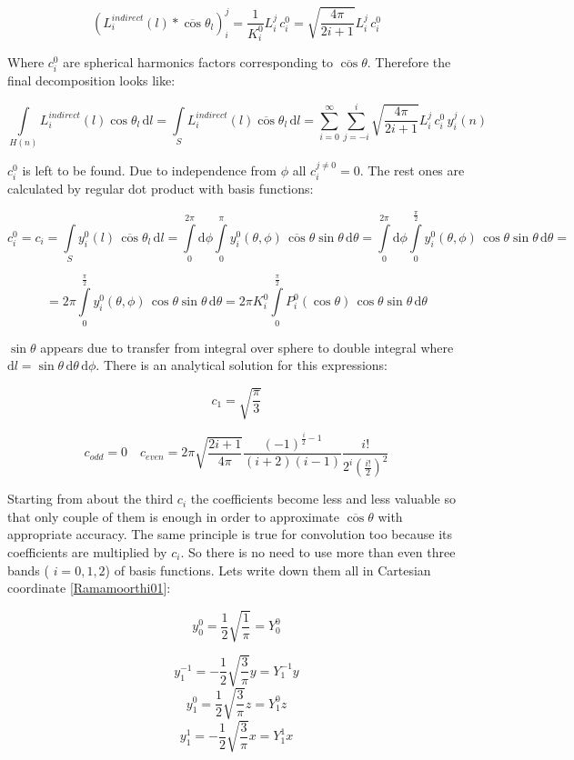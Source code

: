 \[(L_i^{indirect}(l) \ast \overline{\cos}\theta_l)_i^j = \frac{1}{K_i^0}L_i^j\, c_i^0 = \sqrt{\frac{4\pi}{2i+1}}L_i^j\, c_i^0\]

Where $c_i^0$ are spherical harmonics factors corresponding to $\overline{\cos}\theta$. Therefore the final decomposition looks like\+:

\[\int\limits_{H(n)} L_i^{indirect}(l) \cos\theta_l\, \mathrm{d}l = \int\limits_S L_i^{indirect}(l)\overline{\cos}\theta_l\, \mathrm{d}l = \sum_{i=0}^\infty \sum_{j = -i}^i \sqrt{\frac{4\pi}{2i+1}}L_i^j\, c_i^0\, y_i^j(n)\]

$c_i^0$ is left to be found. Due to independence from $\phi$ all $c_i^{j \neq 0} = 0$. The rest ones are calculated by regular dot product with basis functions\+:

\[c_i^0 = c_i = \int\limits_S y_i^0(l)\, \overline{\cos}\theta_l\, \mathrm{d}l = \int\limits_0^{2\pi} \mathrm{d}\phi \int\limits_0^\pi y_i^0(\theta, \phi)\, \overline{\cos}\theta \sin\theta\, \mathrm{d}\theta = \int\limits_0^{2\pi} \mathrm{d}\phi \int\limits_0^\frac{\pi}{2} y_i^0(\theta, \phi)\, \cos\theta\sin\theta\, \mathrm{d}\theta = \]

\[= 2\pi\int\limits_0^\frac{\pi}{2} y_i^0(\theta, \phi)\, \cos\theta\sin\theta\, \mathrm{d}\theta = 2\pi K_i^0\int\limits_0^\frac{\pi}{2} P_i^0(\cos\theta)\, \cos\theta\sin\theta\, \mathrm{d}\theta\]

$\sin\theta$ appears due to transfer from integral over sphere to double integral where $\mathrm{d}l = \sin\theta\, \mathrm{d}\theta\, \mathrm{d}\phi$. There is an analytical solution for this expressions\+:

\[c_1 = \sqrt{\frac{\pi}{3}}\]

\[c_{odd} = 0 \quad c_{even} = 2\pi\sqrt{\frac{2i+1}{4\pi}}\frac{(-1)^{\frac{i}{2}-1}}{(i+2)(i-1)}\frac{i!}{2^i\left(\frac{i!}{2}\right)^2}\]

Starting from about the third $c_i$ the coefficients become less and less valuable so that only couple of them is enough in order to approximate $\overline{\cos}\theta$ with appropriate accuracy. The same principle is true for convolution too because its coefficients are multiplied by $c_i$. So there is no need to use more than even three bands ( $i = 0, 1, 2$) of basis functions. Lets write down them all in Cartesian coordinate \mbox{[}\hyperlink{specification__pbr_math_Ramamoorthi01}{Ramamoorthi01}\mbox{]}\+:

\[y_0^0 = \frac{1}{2}\sqrt{\frac{1}{\pi}} = Y_0^0\]

\[y_1^{-1} = -\frac{1}{2}\sqrt{\frac{3}{\pi}}y = Y_1^{-1}y\] \[y_1^0 = \frac{1}{2}\sqrt{\frac{3}{\pi}}z = Y_1^0z\] \[y_1^1 = -\frac{1}{2}\sqrt{\frac{3}{\pi}}x = Y_1^1x\]

